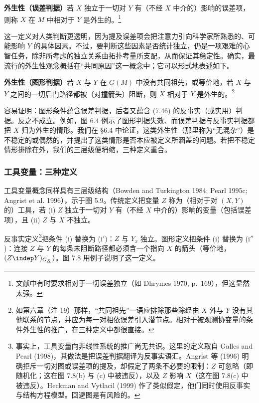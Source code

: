 \medskip
\noindent\textbf{外生性（误差判据）}\quad 若 $X$ 独立于一切对 $Y$ 有（不经 $X$ 中介的）影响的误差项，则称 $X$ 在 $M$ 中相对于 $Y$ 是外生的。\footnote{文献中有时要求相对于一切误差独立（如 Dhrymes 1970, p.~169），但这显然太强。}

这一定义对人类判断更透明，因为提及误差项会把注意力引向科学家所熟悉的、可能影响 $Y$ 的具体因素。不过，要判断这些因素是否统计独立，仍是一项艰难的心智任务，除非所考虑的独立关系由拓扑考量所支配，从而保证其稳定性。确实，最流行的外生性观念概括在“共同原因”这一概念中；它可以形式地表述如下。

\medskip
\noindent\textbf{外生性（图形判据）}\quad 若 $X$ 与 $Y$ 在 $G(M)$ 中没有共同祖先，或等价地，若 $X$ 与 $Y$ 之间的一切后门路径都被（对撞箭头）阻断，则 $X$ 相对于 $Y$ 是外生的。\footnote{如第六章（注 19）那样，“共同祖先”一语应排除那些除经由 $X$ 外与 $Y$ 没有其他联系的节点，并应为每一对相依误差引入潜节点。相对于被观测协变量的条件外生性的推广，在三种定义中都很直接。}

容易证明：图形条件蕴含误差判据，后者又蕴含 \textup{(7.46)} 的反事实（或实用）判据。反之不成立。例如，图 6.4 例示了图形判据失效、而误差判据与反事实判据都把 $X$ 归为外生的情形。我们在 \S 6.4 中论证，这类外生性（那里称为“无混杂”）是不稳定的或偶然的，并提出了这类情形是否本应被定义所涵盖的问题。若把不稳定情形排除在外，我们的三层级便坍缩，三种定义重合。

\subsubsection*{工具变量：三种定义}

工具变量概念同样具有三层级结构（Bowden and Turkington 1984; Pearl 1995c; Angrist et al. 1996），示于图 5.9。传统定义把变量 $Z$ 称为（相对于对 $(X,Y)$ 的）工具，若 (i) $Z$ 独立于一切对 $Y$ 有（不经 $X$ 中介的）影响的变量（包括误差项），且 (ii) $Z$ 与 $X$ 不独立。

反事实定义\footnote{事实上，工具变量向非线性系统的推广尚无共识。这里的定义取自 Galles and Pearl (1998)，其做法是把误差判据翻译为反事实语汇。Angrist 等 (1996) 明确拒斥一切对图或误差项的提及，却假定了两条不必要的限制：$Z$ 可忽略（即随机化；这在图 7.8(b) 与 (c) 中被违反），以及 $Z$ 影响 $X$（这在图 7.8(c) 中被违反）。Heckman and Vytlacil (1999) 作了类似假定，他们同时使用反事实与结构方程模型。回避图是有风险的。}把条件 (i) 替换为 (i$'$)：$Z$ 与 $Y_x$ 独立。图形定义把条件 (i) 替换为 (i$''$)：连接 $Z$ 与 $Y$ 的每条未阻断路径都必须含一个指向 $X$ 的箭头（等价地，$(Z\indep Y)_{G_{\underline{X}}}$）。图 7.8 用例子说明了这一定义。

